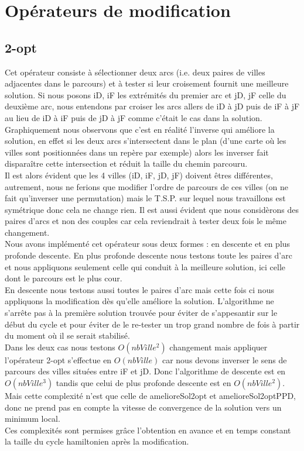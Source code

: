 \documentclass[12pt,a4paper]{article}
\begin{document}
\section{Opérateurs de modification}

\subsection{2-opt}
Cet opérateur consiste à sélectionner deux arcs (i.e. deux paires de villes adjacentes dans le parcours) et à tester si leur croisement fournit une meilleure solution. Si nous posons iD, iF les extrémités du premier arc et jD, jF celle du deuxième arc, nous entendons par croiser les arcs allers de iD à jD puis de iF à jF au lieu de iD à iF puis de jD à jF comme c’était le cas dans la solution. Graphiquement nous observons que c'est en réalité l'inverse qui améliore la solution, en effet si les deux arcs s’intersectent dans le plan (d'une carte où les villes sont positionnées dans un repère par exemple) alors les inverser fait disparaître cette intersection et réduit la taille du chemin parcouru.\\

Il est alors évident que les 4 villes (iD, iF, jD, jF) doivent êtres différentes, autrement, nous ne ferions que modifier l'ordre de parcours de ces villes (on ne fait qu'inverser une permutation) mais le T.S.P. sur lequel nous travaillons est symétrique donc cela ne change rien. Il est aussi évident que nous considèrons des paires d'arcs et non des couples car cela reviendrait à tester deux fois le même changement.\\

Nous avons implémenté cet opérateur sous deux formes : en descente et en plus profonde descente.
En plus profonde descente nous testons toute les paires d'arc et nous appliquons seulement celle qui conduit à la meilleure solution, ici celle dont le parcours est le plus cour.\\

En descente nous testons aussi toutes le paires d'arc mais cette fois ci nous appliquons la modification dès qu'elle améliore la solution. L'algorithme ne s’arrête pas à la première solution trouvée pour éviter de s'appesantir sur le début du cycle et pour éviter de le re-tester un trop grand nombre de fois à partir du moment où il se serait stabilisé.\\

Dans les deux cas nous testons $O(nbVille^2)$ changement mais appliquer l'opérateur 2-opt s’effectue en $O(nbVille)$ car nous devons inverser le sens de parcours des villes situées entre iF et jD. Donc l'algorithme de descente est en $O(nbVille^3)$ tandis que celui de plus profonde descente est en $O(nbVille^2)$. Mais cette complexité n'est que celle de amelioreSol2opt et amelioreSol2optPPD, donc ne prend pas en compte la vitesse de convergence de la solution vers un minimum local.\\
Ces complexités sont permises grâce l'obtention en avance et en temps constant la taille du cycle hamiltonien après la modification.
 
\end{document}
